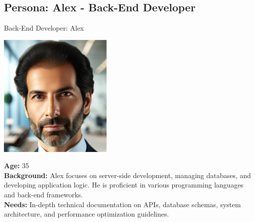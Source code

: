 \subsection*{Persona: Alex - Back-End Developer}
\begin{persona}{Back-End Developer: Alex}
\begin{tcbraster}[raster columns=2, raster column skip=5mm]
  \begin{tcolorbox}[width=0.2\linewidth, colback=white, colframe=white, boxrule=0pt, halign=center]
   \includegraphics[width=\linewidth, height=6cm, keepaspectratio]{Images/Alex.jpg}
  \end{tcolorbox}
  \begin{tcolorbox}[width=0.8\linewidth, colback=white, colframe=white, boxrule=0pt]
    \textbf{Age:} 35\\
    \textbf{Background:} Alex focuses on server-side development, managing databases, and developing application logic. He is proficient in various programming languages and back-end frameworks.\\
    \textbf{Needs:} In-depth technical documentation on APIs, database schemas, system architecture, and performance optimization guidelines.
  \end{tcolorbox}
\end{tcbraster}
\end{persona}


